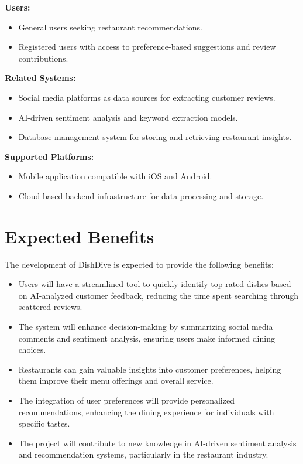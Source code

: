 \textbf{Users:}
\begin{itemize}
\item General users seeking restaurant recommendations.
\item Registered users with access to preference-based suggestions and review contributions.
\end{itemize}

\textbf{Related Systems:}
\begin{itemize}
\item Social media platforms as data sources for extracting customer reviews.
\item AI-driven sentiment analysis and keyword extraction models.
\item Database management system for storing and retrieving restaurant insights.
\end{itemize}

\textbf{Supported Platforms:}
\begin{itemize}
\item Mobile application compatible with iOS and Android.
\item Cloud-based backend infrastructure for data processing and storage.
\end{itemize}

\section{Expected Benefits}
The development of DishDive is expected to provide the following benefits:
\begin{itemize}
\item Users will have a streamlined tool to quickly identify top-rated dishes based on AI-analyzed customer feedback, reducing the time spent searching through scattered reviews.
\item The system will enhance decision-making by summarizing social media comments and sentiment analysis, ensuring users make informed dining choices.
\item Restaurants can gain valuable insights into customer preferences, helping them improve their menu offerings and overall service.
\item The integration of user preferences will provide personalized recommendations, enhancing the dining experience for individuals with specific tastes.
\item The project will contribute to new knowledge in AI-driven sentiment analysis and recommendation systems, particularly in the restaurant industry.
\end{itemize}

